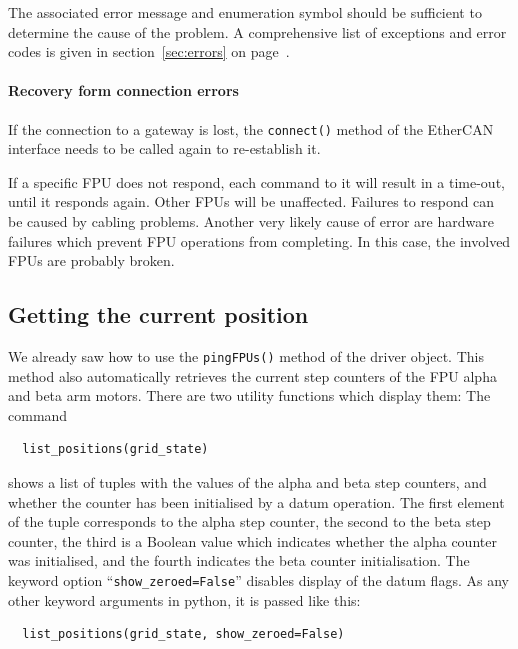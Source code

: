 \documentclass[11pt,a4paper]{report}
\begin{document}
The associated error message and enumeration symbol should be
sufficient to determine the cause of the problem. A comprehensive list
of exceptions and error codes is given in section~\ref{sec:errors} on
page~\pageref{sec:errors}.

\paragraph{Recovery form connection errors}
If the connection to a gateway is lost, the \texttt{connect()} method
of the EtherCAN interface needs to be called again to re-establish it.

If a specific FPU does not respond, each command to it will result in
a time-out, until it responds again. Other FPUs will be unaffected.
Failures to respond can be caused by cabling problems. Another very
likely cause of error are hardware failures which prevent FPU
operations from completing. In this case, the involved FPUs are
probably broken.



\subsection{Getting the current position}
   We already saw how to use
the \texttt{pingFPUs()} method of the driver object. This method also
automatically retrieves the current step counters of the FPU alpha and
beta arm motors.  There are two utility functions which display them:
The command

\begin{verbatim}
  list_positions(grid_state)
\end{verbatim}

shows a list of tuples with the values of the alpha and beta step
counters, and whether the counter has been initialised by a datum
operation. The first element of the tuple corresponds to the alpha
step counter, the second to the beta step counter, the third is a
Boolean value which indicates whether the alpha counter was
initialised, and the fourth indicates the beta counter
initialisation. The keyword option ``\texttt{show\_zeroed=False}''
disables display of the datum flags.  As any other keyword arguments
in python, it is passed like this:

\begin{verbatim}
  list_positions(grid_state, show_zeroed=False)
\end{verbatim}
\end{document}
